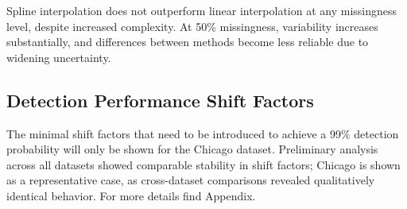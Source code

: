 \begin{table}[H]
\centering
\caption{\ac{ARL}$_0$ performance with standard deviation under 50\% missingness.}
\label{tab:arl0_50pct}
\end{table}

Spline interpolation does not outperform linear interpolation at any missingness level, despite increased complexity.
At 50\% missingness, variability increases substantially, and differences between methods become less reliable due to widening uncertainty.


\subsection{Detection Performance Shift Factors}

The minimal shift factors that need to be introduced to achieve a 99\% detection probability will only be shown for the Chicago dataset. Preliminary analysis across all datasets showed comparable stability in shift factors; Chicago is shown as a representative case, as cross-dataset comparisons revealed qualitatively identical behavior. For more details find Appendix.


